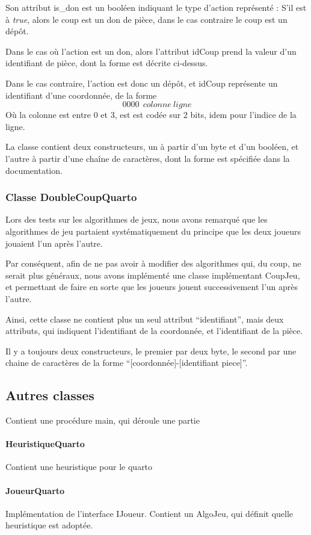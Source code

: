 \documentclass{article}
\begin{document}
Son attribut is\_don est un booléen indiquant le type d'action
représenté : S'il est à \emph{true}, alors le coup est un don de
pièce, dans le cas contraire le coup est un dépôt.

Dans le cas o\`u l'action est un don, alors l'attribut idCoup prend la 
valeur d'un identifiant de pièce, dont la forme est décrite
ci-dessus. 

Dans le cas contraire, l'action est donc un dépôt, et idCoup
représente un identifiant d'une coordonnée, de la forme
\[ 0000~~colonne~ligne\]
O\`u la colonne est entre 0 et 3, est est codée sur 2 bits, idem pour
l'indice de la ligne.

La classe contient deux constructeurs, un à partir d'un byte et d'un
booléen, et l'autre à partir d'une chaîne de caractères, dont la forme
est spécifiée dans la documentation. %


\subsubsection{Classe DoubleCoupQuarto}
Lors des tests sur les algorithmes de jeux, nous avons remarqué que
les algorithmes de jeu partaient systématiquement du principe que les
deux joueurs jouaient l'un après l'autre.

Par conséquent, afin de ne pas avoir à modifier des algorithmes qui,
du coup, ne serait plus généraux, nous avons implémenté une classe
implémentant CoupJeu, et permettant de faire en sorte que les joueurs
jouent successivement l'un après l'autre.

Ainsi, cette classe ne contient plus un seul attribut ``identifiant'',
mais deux attributs, qui indiquent l'identifiant de la coordonnée,
et l'identifiant de la pièce.

Il y a toujours deux constructeurs, le premier par deux byte, le
second par une chaine de caractères de la forme
``[coordonnée]-[identifiant piece]''.

\subsection{Autres classes}
Contient une procédure main, qui déroule une partie

\paragraph{HeuristiqueQuarto}
Contient une heuristique pour le quarto

\paragraph{JoueurQuarto}
Implémentation de l'interface IJoueur. Contient un AlgoJeu, qui
définit quelle heuristique est adoptée.
\end{document}
